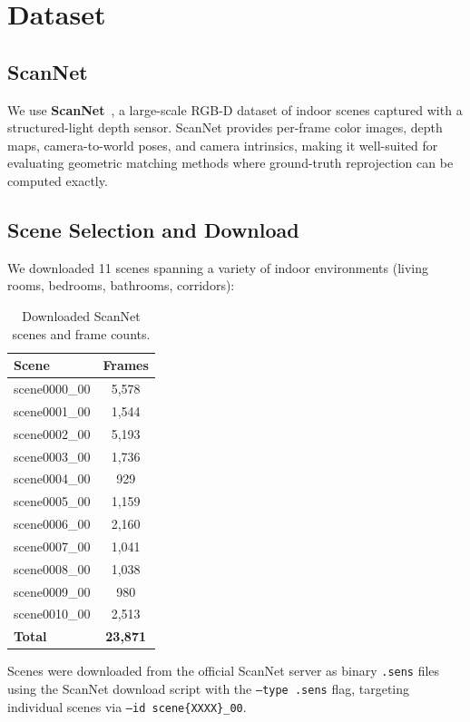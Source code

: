 \documentclass[10pt]{article}
\begin{document}
\section{Dataset}

\subsection{ScanNet}

We use \textbf{ScanNet}~\cite{scannet}, a large-scale RGB-D dataset of indoor scenes captured with a structured-light depth sensor. ScanNet provides per-frame color images, depth maps, camera-to-world poses, and camera intrinsics, making it well-suited for evaluating geometric matching methods where ground-truth reprojection can be computed exactly.

\subsection{Scene Selection and Download}

We downloaded 11 scenes spanning a variety of indoor environments (living rooms, bedrooms, bathrooms, corridors):

\begin{table}[H]
\centering
\caption{Downloaded ScanNet scenes and frame counts.}
\label{tab:scenes}
\small
\begin{tabular}{lc}
\toprule
\textbf{Scene} & \textbf{Frames} \\
\midrule
scene0000\_00 & 5,578 \\
scene0001\_00 & 1,544 \\
scene0002\_00 & 5,193 \\
scene0003\_00 & 1,736 \\
scene0004\_00 &   929 \\
scene0005\_00 & 1,159 \\
scene0006\_00 & 2,160 \\
scene0007\_00 & 1,041 \\
scene0008\_00 & 1,038 \\
scene0009\_00 &   980 \\
scene0010\_00 & 2,513 \\
\midrule
\textbf{Total} & \textbf{23,871} \\
\bottomrule
\end{tabular}
\end{table}

Scenes were downloaded from the official ScanNet server as binary \texttt{.sens} files using the ScanNet download script with the \texttt{--type .sens} flag, targeting individual scenes via \texttt{--id scene\{XXXX\}\_00}.
\end{document}
